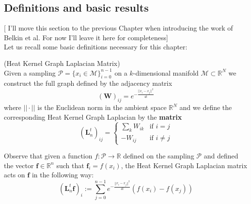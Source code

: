 \subsection{Definitions and basic results}
[ I'll move this section to the previous Chapter when introducing the work of Belkin et al. For now I'll leave it here for completeness]\\
Let us recall some basic definitions necessary for this chapter:
\vspace{0.5cm}
\begin{definition}{}(Heat Kernel Graph Laplacian Matrix)\\
	\label{def:Heat Kernel Graph Laplacian Matrix}
	Given a sampling $ \mathcal P = \{x_i\in\mathcal M\}_{i=0}^{n-1}$ on a $k$-dimensional manifold $\mathcal M\subset \mathbb R^N$ we construct the full graph defined by the adjacency matrix 
	$$(\mathbf W)_{ij}=e^{-\frac{||x_i-x_j||^2}{4t}}$$
	 where $||\cdot||$ is the Euclidean norm in the ambient space $\mathbb R^N$ and we define the corresponding Heat Kernel Graph Laplacian by the \textbf{matrix} 
    $$(\mathbf{L}_n^t)_{ij}=\begin{cases}
    \sum_k W_{ik} & \text{if }i=j\\
    -W_{ij}&\text{if }i\neq j
    \end{cases}$$
\end{definition}
\vspace{0.5cm}
Observe that given a function $f: \mathcal P \rightarrow \mathbb R$ defined on the sampling $ \mathcal P$ and defined the vector $\mathbf f\in\mathbb R^n$ such that $\mathbf f_i = f(x_i)$, the Heat Kernel Graph Laplacian matrix acts on $\mathbf f$ in the following way:
$$ (\mathbf L_n^t \mathbf f)_i:=  \sum_{j=0}^{n-1} e^{-\frac{||x_i-x_j||^2}{4t}}\left(f(x_i)-f(x_j)\right)$$

